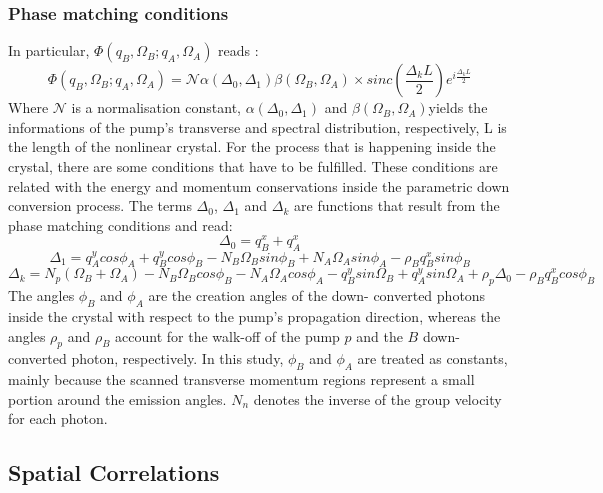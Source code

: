 \subsubsection{Phase matching conditions}
In particular, $\Phi(q_B,\Omega_B;q_A,\Omega_A)$ reads \cite{spatiocorrelations}:
\begin{equation}
\label{eq:mode}
\Phi(q_B,\Omega_B;q_A,\Omega_A) = \mathcal{N} \alpha(\Delta_0,\Delta_1) \beta(\Omega_B,\Omega_A) \times
sinc \left( \frac{\Delta_k L}{2} \right) e^{i \frac{\Delta_k L}{2}}
\end{equation}
Where $\mathcal{N}$ is a normalisation constant, $\alpha(\Delta_0,\Delta_1)$
and $\beta(\Omega_B,\Omega_A)$yields the informations of the pump's transverse 
and spectral distribution, respectively, L is the length of the nonlinear crystal.
For the process that is happening inside the crystal, there are some conditions that have to be fulfilled. These conditions are related with the energy and momentum conservations inside the parametric down conversion process.
The terms $\Delta_0$, $\Delta_1$ and $\Delta_k$ are functions that result from the phase matching conditions and read:
\begin{equation}
\Delta_0=q_B^x + q_A^x
\end{equation}
\begin{equation}
\Delta_1= q_A^y cos\phi_A + q_B^y cos\phi_B - N_B \Omega_B sin\phi_B + N_A \Omega_A sin\phi_A - \rho_B q_B^x sin\phi_B 
\end{equation}
\begin{equation}
\Delta_k=N_p(\Omega_B+\Omega_A)-N_B\Omega_B cos\phi_B - N_A\Omega_A cos\phi_A -q_B^y sin\Omega_B + q_A^y sin\Omega_A + \rho_p \Delta_0 - \rho_B q_B^x cos\phi_B
\end{equation}
The angles $\phi_B$ and $\phi_A$ are the creation angles of the down-
converted photons inside the crystal with respect to the pump’s
propagation direction, whereas the angles $\rho_p$ and $\rho_B$ account for
the walk-off of the pump $p$ and the $B$ down-
converted photon, respectively. 
In this study, $\phi_B$ and $\phi_A$ are treated as constants, 
mainly because the scanned transverse momentum regions represent a small portion around
the emission angles. $N_n$ denotes the inverse of the group velocity for each photon.



\subsection{Spatial Correlations}

